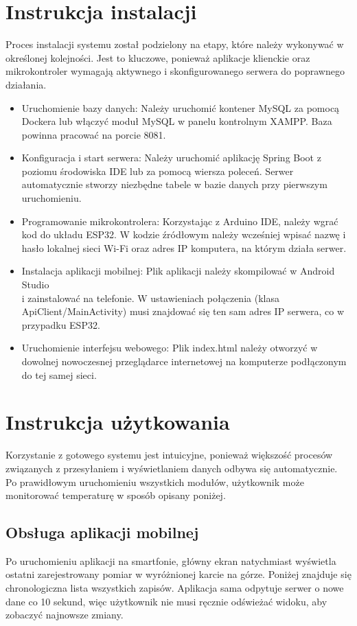 \section{Instrukcja instalacji}
Proces instalacji systemu został podzielony na etapy, które należy wykonywać w określonej kolejności. Jest to kluczowe, ponieważ aplikacje klienckie oraz mikrokontroler wymagają aktywnego i skonfigurowanego serwera do poprawnego działania.
\begin{itemize}
	\item Uruchomienie bazy danych: Należy uruchomić kontener MySQL za pomocą Dockera lub włączyć moduł MySQL w panelu kontrolnym XAMPP. Baza powinna pracować na porcie 8081.
	\item Konfiguracja i start serwera: Należy uruchomić aplikację Spring Boot z poziomu środowiska IDE lub za pomocą wiersza poleceń. Serwer automatycznie stworzy niezbędne tabele w bazie danych przy pierwszym uruchomieniu.
	\item Programowanie mikrokontrolera: Korzystając z Arduino IDE, należy wgrać kod do układu ESP32. W kodzie źródłowym należy wcześniej wpisać nazwę i hasło lokalnej sieci Wi-Fi oraz adres IP komputera, na którym działa serwer.
	\item Instalacja aplikacji mobilnej: Plik aplikacji należy skompilować w Android Studio\\ i zainstalować na telefonie. W ustawieniach połączenia (klasa ApiClient/MainActivity) musi znajdować się ten sam adres IP serwera, co w przypadku ESP32.
	\item Uruchomienie interfejsu webowego: Plik index.html należy otworzyć w dowolnej nowoczesnej przeglądarce internetowej na komputerze podłączonym do tej samej sieci.
\end{itemize}

\section{Instrukcja użytkowania}
Korzystanie z gotowego systemu jest intuicyjne, ponieważ większość procesów związanych z przesyłaniem i wyświetlaniem danych odbywa się automatycznie. Po prawidłowym uruchomieniu wszystkich modułów, użytkownik może monitorować temperaturę w sposób opisany poniżej.

\subsection{Obsługa aplikacji mobilnej}
Po uruchomieniu aplikacji na smartfonie, główny ekran natychmiast wyświetla ostatni zarejestrowany pomiar w wyróżnionej karcie na górze. Poniżej znajduje się chronologiczna lista wszystkich zapisów. Aplikacja sama odpytuje serwer o nowe dane co 10 sekund, więc użytkownik nie musi ręcznie odświeżać widoku, aby zobaczyć najnowsze zmiany.

